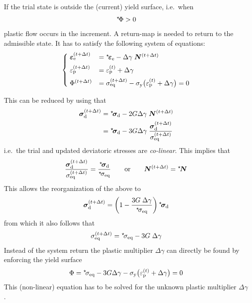 \documentclass[times,namecite]{goose-article}
\newcommand\leftstar[1]{\hspace*{-.3em}~^\star\!#1}
\begin{document}
If the trial state is outside the (current) yield surface, i.e.\ when
\begin{equation}
  \leftstar{\Phi} > 0
\end{equation}
plastic flow occurs in the increment. A return-map is needed to return to the admissible state. It has to satisfy the following system of equations:
\begin{equation}
\begin{cases}
  \;
  \bm{\varepsilon}_\mathrm{e}^{(t+\Delta t)}
  &= \leftstar\bm{\varepsilon}_\mathrm{e}
   - \Delta \gamma \; \bm{N}^{(t+\Delta t)}
  \\[1ex]
  \;
  \varepsilon_\mathrm{p}^{(t+\Delta t)}
  &= \varepsilon_\mathrm{p}^{(t)} + \Delta \gamma
  \\[1ex]
  \;
  \Phi^{(t+\Delta t)}
  &= \sigma_\mathrm{eq}^{(t+\Delta t)}
   - \sigma_\mathrm{y} \big( \varepsilon_\mathrm{p}^{(t)} + \Delta\gamma \big)
   = 0
\end{cases}
\end{equation}

This can be reduced by using that
\begin{align}
  \bm{\sigma}_\mathrm{d}^{(t+\Delta t)}
  &= \leftstar{\bm{\sigma}}_\mathrm{d} - 2 G \Delta \gamma \; \bm{N}^{(t+\Delta t)}
  \\
  &= \leftstar{\bm{\sigma}}_\mathrm{d} - 3 G \Delta \gamma \;
   \frac{ \bm{\sigma}_\mathrm{d}^{(t+\Delta t)} }{ \sigma_\mathrm{eq}^{(t+\Delta t)} }
\end{align}
i.e.\ the trial and updated deviatoric stresses are \emph{co-linear}. This implies that
\begin{equation}
  \frac{ \bm{\sigma}_\mathrm{d}^{(t+\Delta t)} }{ \sigma_\mathrm{eq}^{(t+\Delta t)} }
  =
  \frac{ \leftstar{\bm{\sigma}}_\mathrm{d} }{ \leftstar{\sigma}_\mathrm{eq} }
  \qquad
  \mathrm{or}
  \qquad
  \bm{N}^{(t+\Delta t)} = \leftstar{\bm{N}}
\end{equation}
This allows the reorganization of the above to
\begin{equation}
  \bm{\sigma}_\mathrm{d}^{(t+\Delta t)}
  =
  \left(1 - \frac{ 3 G \; \Delta \gamma }{ \leftstar{\sigma}_\mathrm{eq} } \right)
  \leftstar{\bm{\sigma}}_\mathrm{d}
\end{equation}
from which it also follows that
\begin{equation}
  \sigma_\mathrm{eq}^{(t+\Delta t)} = \leftstar{\sigma}_\mathrm{eq} - 3 G \; \Delta \gamma
\end{equation}
Instead of the system return the plastic multiplier $\Delta \gamma$ can directly be found by enforcing the yield surface
\begin{equation}
\label{eq:return-scalar}
  \Phi
  = \leftstar{\sigma}_\mathrm{eq}
  - 3 G \Delta \gamma
  - \sigma_\mathrm{y} \big( \varepsilon_\mathrm{p}^{(t)} + \Delta \gamma \big)
  = 0
\end{equation}
This (non-linear) equation has to be solved for the unknown plastic multiplier $\Delta \gamma$.
\end{document}
